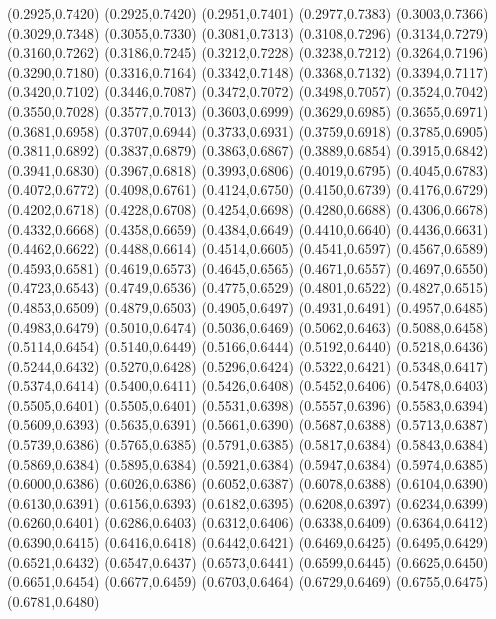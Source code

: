 \PST@ThickBorder(0.2925,0.7420)
(0.2925,0.7420)
(0.2951,0.7401)
(0.2977,0.7383)
(0.3003,0.7366)
(0.3029,0.7348)
(0.3055,0.7330)
(0.3081,0.7313)
(0.3108,0.7296)
(0.3134,0.7279)
(0.3160,0.7262)
(0.3186,0.7245)
(0.3212,0.7228)
(0.3238,0.7212)
(0.3264,0.7196)
(0.3290,0.7180)
(0.3316,0.7164)
(0.3342,0.7148)
(0.3368,0.7132)
(0.3394,0.7117)
(0.3420,0.7102)
(0.3446,0.7087)
(0.3472,0.7072)
(0.3498,0.7057)
(0.3524,0.7042)
(0.3550,0.7028)
(0.3577,0.7013)
(0.3603,0.6999)
(0.3629,0.6985)
(0.3655,0.6971)
(0.3681,0.6958)
(0.3707,0.6944)
(0.3733,0.6931)
(0.3759,0.6918)
(0.3785,0.6905)
(0.3811,0.6892)
(0.3837,0.6879)
(0.3863,0.6867)
(0.3889,0.6854)
(0.3915,0.6842)
(0.3941,0.6830)
(0.3967,0.6818)
(0.3993,0.6806)
(0.4019,0.6795)
(0.4045,0.6783)
(0.4072,0.6772)
(0.4098,0.6761)
(0.4124,0.6750)
(0.4150,0.6739)
(0.4176,0.6729)
(0.4202,0.6718)
(0.4228,0.6708)
(0.4254,0.6698)
(0.4280,0.6688)
(0.4306,0.6678)
(0.4332,0.6668)
(0.4358,0.6659)
(0.4384,0.6649)
(0.4410,0.6640)
(0.4436,0.6631)
(0.4462,0.6622)
(0.4488,0.6614)
(0.4514,0.6605)
(0.4541,0.6597)
(0.4567,0.6589)
(0.4593,0.6581)
(0.4619,0.6573)
(0.4645,0.6565)
(0.4671,0.6557)
(0.4697,0.6550)
(0.4723,0.6543)
(0.4749,0.6536)
(0.4775,0.6529)
(0.4801,0.6522)
(0.4827,0.6515)
(0.4853,0.6509)
(0.4879,0.6503)
(0.4905,0.6497)
(0.4931,0.6491)
(0.4957,0.6485)
(0.4983,0.6479)
(0.5010,0.6474)
(0.5036,0.6469)
(0.5062,0.6463)
(0.5088,0.6458)
(0.5114,0.6454)
(0.5140,0.6449)
(0.5166,0.6444)
(0.5192,0.6440)
(0.5218,0.6436)
(0.5244,0.6432)
(0.5270,0.6428)
(0.5296,0.6424)
(0.5322,0.6421)
(0.5348,0.6417)
(0.5374,0.6414)
(0.5400,0.6411)
(0.5426,0.6408)
(0.5452,0.6406)
(0.5478,0.6403)
(0.5505,0.6401)
\PST@ThickBorder(0.5505,0.6401)
(0.5531,0.6398)
(0.5557,0.6396)
(0.5583,0.6394)
(0.5609,0.6393)
(0.5635,0.6391)
(0.5661,0.6390)
(0.5687,0.6388)
(0.5713,0.6387)
(0.5739,0.6386)
(0.5765,0.6385)
(0.5791,0.6385)
(0.5817,0.6384)
(0.5843,0.6384)
(0.5869,0.6384)
(0.5895,0.6384)
(0.5921,0.6384)
(0.5947,0.6384)
(0.5974,0.6385)
(0.6000,0.6386)
(0.6026,0.6386)
(0.6052,0.6387)
(0.6078,0.6388)
(0.6104,0.6390)
(0.6130,0.6391)
(0.6156,0.6393)
(0.6182,0.6395)
(0.6208,0.6397)
(0.6234,0.6399)
(0.6260,0.6401)
(0.6286,0.6403)
(0.6312,0.6406)
(0.6338,0.6409)
(0.6364,0.6412)
(0.6390,0.6415)
(0.6416,0.6418)
(0.6442,0.6421)
(0.6469,0.6425)
(0.6495,0.6429)
(0.6521,0.6432)
(0.6547,0.6437)
(0.6573,0.6441)
(0.6599,0.6445)
(0.6625,0.6450)
(0.6651,0.6454)
(0.6677,0.6459)
(0.6703,0.6464)
(0.6729,0.6469)
(0.6755,0.6475)
(0.6781,0.6480)

